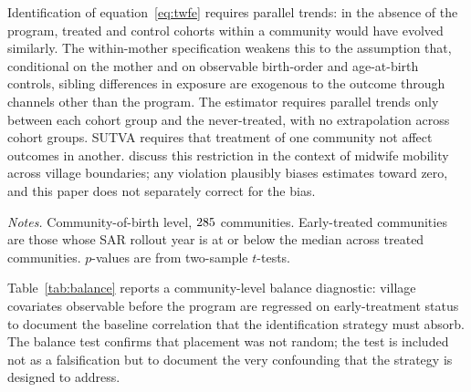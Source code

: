 Identification of equation~\eqref{eq:twfe} requires parallel trends: in the absence of the program, treated and control cohorts within a community would have evolved similarly. The within-mother specification weakens this to the assumption that, conditional on the mother and on observable birth-order and age-at-birth controls, sibling differences in exposure are exogenous to the outcome through channels other than the program. The \textcite{callawaysantanna2021} estimator requires parallel trends only between each cohort group and the never-treated, with no extrapolation across cohort groups. SUTVA requires that treatment of one community not affect outcomes in another. \textcite{ahsan2021} discuss this restriction in the context of midwife mobility across village boundaries; any violation plausibly biases estimates toward zero, and this paper does not separately correct for the bias.

\begin{table}[!htbp] \centering \caption{Balance: pre-program village covariates by early- vs.\ late-treatment status.} \label{tab:balance}  \begin{minipage}{0.85\textwidth} \footnotesize \emph{Notes.} Community-of-birth level, $285$ communities. Early-treated communities are those whose SAR rollout year is at or below the median across treated communities. $p$-values are from two-sample $t$-tests. \end{minipage} \end{table}

Table~\ref{tab:balance} reports a community-level balance diagnostic: village covariates observable before the program are regressed on early-treatment status to document the baseline correlation that the identification strategy must absorb. The balance test confirms that placement was not random; the test is included not as a falsification but to document the very confounding that the strategy is designed to address.
